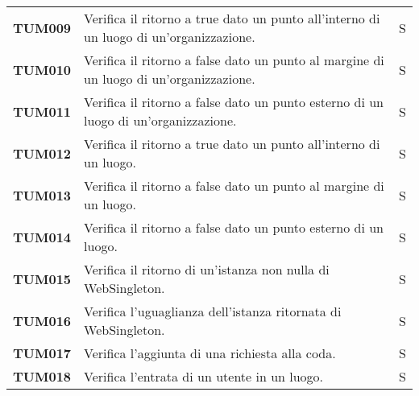 \documentclass[../../piano-di-qualifica.tex]{subfiles}
\begin{document}
\begin{longtable}[H]{>{\centering\bfseries}m{3cm} >{}m{10cm} >{\centering\arraybackslash}m{3cm}}
  TUM009             & Verifica il ritorno a true dato un punto all'interno di un luogo di un'organizzazione.                              & S                             \\

  TUM010             & Verifica il ritorno a false dato un punto al margine di un luogo di un'organizzazione.                              & S                             \\

  TUM011             & Verifica il ritorno a false dato un punto esterno di un luogo di un'organizzazione.                                 & S                             \\

  TUM012             & Verifica il ritorno a true dato un punto all'interno di un luogo.                                                   & S                             \\

  TUM013             & Verifica il ritorno a false dato un punto al margine di un luogo.                                                   & S                             \\

  TUM014             & Verifica il ritorno a false dato un punto esterno di un luogo.                                                      & S                             \\

  TUM015             & Verifica il ritorno di un'istanza non nulla di WebSingleton.                                                        & S                             \\

  TUM016             & Verifica l'uguaglianza dell'istanza ritornata di WebSingleton.                                                      & S                             \\

  TUM017             & Verifica l'aggiunta di una richiesta alla coda.                                                                     & S                             \\ %

  TUM018             & Verifica l'entrata di un utente in un luogo.                                                                        & S                             \\ %


\end{longtable}
\end{document}
